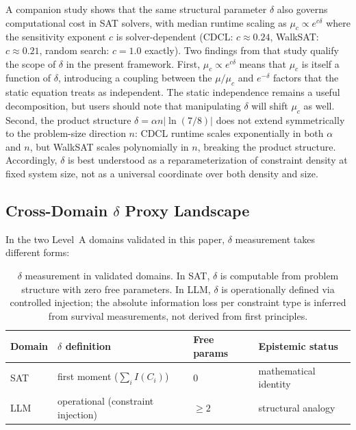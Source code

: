 \documentclass[11pt,a4paper]{article}
\begin{document}
A companion study \citep{sunagawa2026sat} shows that the same structural parameter $\delta$ also governs computational cost in SAT solvers, with median runtime scaling as $\mu_c \propto e^{c\delta}$ where the sensitivity exponent $c$ is solver-dependent (CDCL: $c \approx 0.24$, WalkSAT: $c \approx 0.21$, random search: $c = 1.0$ exactly). Two findings from that study qualify the scope of $\delta$ in the present framework. First, $\mu_c \propto e^{c\delta}$ means that $\mu_c$ is itself a function of $\delta$, introducing a coupling between the $\mu/\mu_c$ and $e^{-\delta}$ factors that the static equation treats as independent. The static independence remains a useful decomposition, but users should note that manipulating $\delta$ will shift $\mu_c$ as well. Second, the product structure $\delta = \alpha n |\ln(7/8)|$ does not extend symmetrically to the problem-size direction $n$: CDCL runtime scales exponentially in both $\alpha$ and $n$, but WalkSAT scales polynomially in $n$, breaking the product structure. Accordingly, $\delta$ is best understood as a reparameterization of constraint density at fixed system size, not as a universal coordinate over both density and size.

\subsection{Cross-Domain \texorpdfstring{$\delta$}{δ} Proxy Landscape}

In the two Level~A domains validated in this paper, $\delta$ measurement takes different forms:

\begin{table}[ht]
\centering
\small
\begin{tabular}{llll}
\toprule
\textbf{Domain} & \textbf{$\delta$ definition} & \textbf{Free params} & \textbf{Epistemic status} \\
\midrule
SAT & first moment ($\sum_i I(C_i)$) & 0 & mathematical identity \\
LLM & operational (constraint injection) & $\geq 2$ & structural analogy \\
\bottomrule
\end{tabular}
\caption{$\delta$ measurement in validated domains. In SAT, $\delta$ is computable from problem structure with zero free parameters. In LLM, $\delta$ is operationally defined via controlled injection; the absolute information loss per constraint type is inferred from survival measurements, not derived from first principles.}
\label{tab:proxy_landscape}
\end{table}
\end{document}
